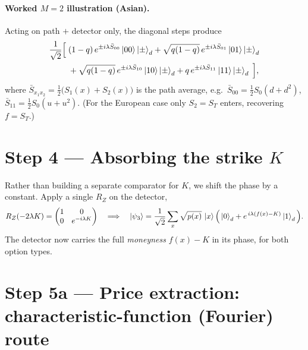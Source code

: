 \documentclass{article}
\begin{document}
\paragraph{Worked $M=2$ illustration (Asian).} Acting on path $+$ detector only, the diagonal steps produce
\begin{align}
\frac{1}{\sqrt2}\Big[\;
& (1-q)\,e^{\pm i\lambda \bar S_{00}}\ket{00}\ket{\pm}_d
 + \sqrt{q(1-q)}\,e^{\pm i\lambda \bar S_{01}}\ket{01}\ket{\pm}_d \notag\\
&+ \sqrt{q(1-q)}\,e^{\pm i\lambda \bar S_{10}}\ket{10}\ket{\pm}_d
 + q\,e^{\pm i\lambda \bar S_{11}}\ket{11}\ket{\pm}_d \;\Big],
\end{align}
where $\bar S_{x_1x_2}=\tfrac12\big(S_1(x)+S_2(x)\big)$ is the path average, e.g.\ $\bar S_{00}=\tfrac12 S_0(d+d^2)$, $\bar S_{11}=\tfrac12 S_0(u+u^2)$. (For the European case only $S_2=S_T$ enters, recovering $f=S_T$.)


\section{Step 4 --- Absorbing the strike $K$}

Rather than building a separate comparator for $K$, we shift the phase by a constant. Apply a single $R_Z$ on the detector,
\begin{equation}
R_Z(-2\lambda K) =\begin{pmatrix}1 & 0\\ 0 & e^{-i\lambda K}\end{pmatrix}
\quad\Longrightarrow\quad
\ket{\psi_3} = \frac{1}{\sqrt2}\sum_x\sqrt{p(x)}\,\ket{x}\Big(\ket{0}_d + e^{\,i\lambda(f(x)-K)}\ket{1}_d\Big).
\end{equation}
The detector now carries the full \emph{moneyness} $f(x)-K$ in its phase, for both option types.


\section{Step 5a --- Price extraction: characteristic-function (Fourier) route}\label{sec_fourier}
\end{document}

